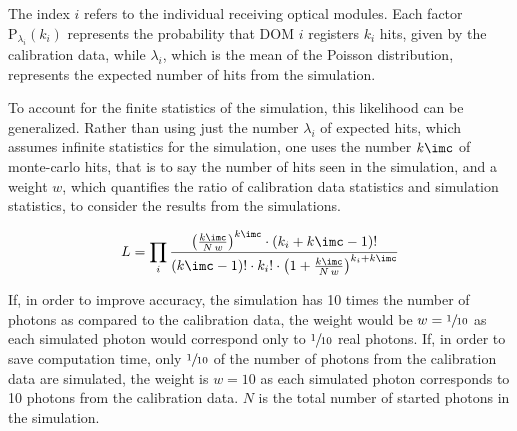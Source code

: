 The index $i$ refers to the individual receiving optical modules. Each factor $\text{P}_{\lambda_i}(k_i)$ represents the probability that DOM $i$ registers $k_i$ hits, given by the calibration data, while $\lambda_i$, which is the mean of the Poisson distribution, represents the expected number of hits from the simulation.

%
%

To account for the finite statistics of the simulation, this likelihood can be generalized. Rather than using just the number $\lambda_i$ of expected hits, which assumes infinite statistics for the simulation, one uses the number $k\imc$ of monte-carlo hits, that is to say the number of hits seen in the simulation, and a weight $w$, which quantifies the ratio of calibration data statistics and simulation statistics, to consider the results from the simulations. \cite[equation 21]{Gluesenkamp2018}

\begin{equation}
  L = \prod_{i} \frac%
    {\left(\frac{k\imc}{N\,w}\right)^{k\imc} \cdot \left(k_i + k\imc - 1\right)!}%
    {(k\imc - 1)! \cdot k_i! \cdot \left( 1 + \frac{k\imc}{N\,w} \right)^{k_i + k\imc}}
\end{equation}

If, in order to improve accuracy, the simulation has 10 times the number of photons as compared to the calibration data, the weight would be $w=\sfrac{1}{10}$ as each simulated photon would correspond only to $\sfrac{1}{10}$ real photons. If, in order to save computation time, only $\sfrac{1}{10}$ of the number of photons from the calibration data are simulated, the weight is $w=10$ as each simulated photon corresponds to 10 photons from the calibration data.  $N$ is the total number of started photons in the simulation.


